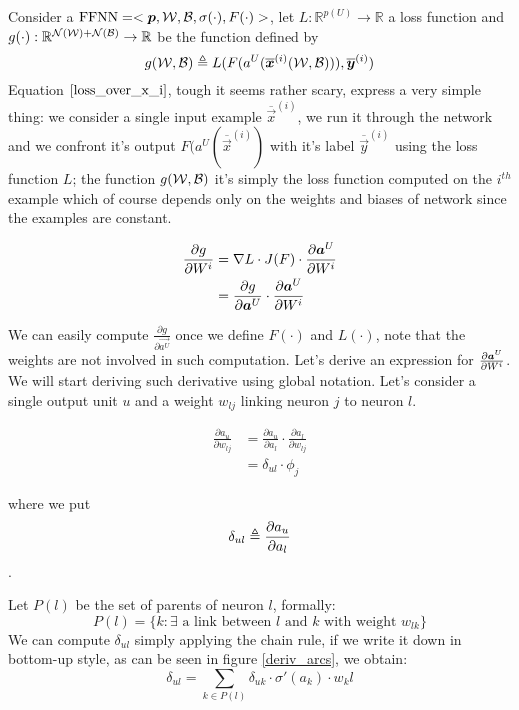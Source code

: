 Consider a $\mathrm{FFNN}=<\boldsymbol{p},\mathcal{W},\mathcal{B},\sigma(\cdot),F(\cdot)>$, let $L:\mathbb{R}^{p(U)} \rightarrow \mathbb{R}$ a loss function and 
$g(\cdot):\mathbb{R}^{\mathcal{N}(\mathcal{W})+\mathcal{N}(\mathcal{B})} \rightarrow \mathbb{R}$ be the function defined by
\begin{equation}
g(\mathcal{W},\mathcal{B}) \triangleq L(F(a^U( \overline{\boldsymbol{x}}^{(i)} (\mathcal{W},\mathcal{B}))),\overline{\boldsymbol{y}}^{(i)} )
\label{loss_over_x_i}
\end{equation}
Equation $\ref{loss_over_x_i}$, tough it seems rather scary, express a very simple thing: we consider a single input example 
$\overline{\vec{x}}^{(i)}$, we run it through the network and we confront it's output $F(a^U( \overline{\vec{x}}^{(i)}) $ with it's label
$\overline{\vec{y}}^{(i)}$ using the loss function $L$; the function $g(\mathcal{W},\mathcal{B})$ it's simply the loss function computed on the $i^{th}$ example
which of course depends only on the weights and biases of network since the examples are constant.


\begin{align}
\frac{\partial g}{\partial W^i} &= \nabla L \cdot J(F) \cdot \frac{\partial \boldsymbol{a}^U}{\partial W^i}\\
&= \frac{\partial g}{\partial \boldsymbol{a}^U} \cdot \frac{\partial \boldsymbol{a}^U}{\partial W^i}
\end{align}


We can easily compute $\frac{\partial g}{\partial \vec{a^U}}$ once we define $F(\cdot)$ and $L(\cdot)$, note that the weights are not involved in such computation.
Let's derive an expression for $\frac{\partial \boldsymbol{a}^U}{\partial W^i}$.
We will start deriving such derivative using global notation. Let's consider a single output unit $u$ and a weight $w_{lj}$ linking neuron $j$ to neuron $l$.


\begin{align}
\frac{\partial a_u}{\partial w_{lj}} &= \frac{\partial a_u}{\partial a_l} \cdot \frac{\partial a_l}{\partial w_{lj}}\\
&=\delta_{ul} \cdot \phi_j
\end{align}

where we put $$\delta_{ul} \triangleq \frac{\partial a_u}{\partial a_l}$$.

Let $P(l)$ be the set of parents of neuron $l$, formally:
\begin{equation} 
P(l) = \{ k: \exists \text{ a link between $l$ and $k$ with weight } w_{lk} \}
\end{equation}
We can compute $\delta_{ul}$ simply applying the chain rule, if we write it down in bottom-up style, as can be seen in figure \ref{deriv_arcs}, we obtain:
\begin{equation}
\delta_{ul} = \sum_{k\in P(l)} \delta_{uk} \cdot \sigma'(a_k)\cdot w_kl
\end{equation}

